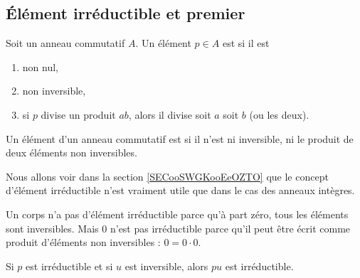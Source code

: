 \subsection{Élément irréductible et premier}

\begin{definition}       \label{DEFooZCRQooWXRalw}
	Soit un anneau commutatif \( A\). Un élément \( p\in A\) est  si il est
	\begin{enumerate}
		\item
		      non nul,
		\item
		      non inversible,
		\item       \label{ITEMooPMTTooCVHPIm}
		      si \( p\) divise un produit \( ab\), alors il divise soit \( a\) soit \( b\) (ou les deux).
	\end{enumerate}
\end{definition}

\begin{definition}  \label{DeirredBDhQfA}
	Un élément d'un anneau commutatif est  si il n'est ni inversible, ni le produit de deux éléments non inversibles. 
\end{definition}

\begin{normaltext}
	Nous allons voir dans la section \ref{SECooSWGKooEeOZTO} que le concept d'élément irréductible n'est vraiment utile que dans le cas des anneaux intègres.
\end{normaltext}

\begin{example}
	Un corps n'a pas d'élément irréductible parce qu'à part zéro, tous les éléments sont inversibles. Mais \( 0\) n'est pas irréductible parce qu'il peut être écrit comme produit d'éléments non inversibles : \( 0=0\cdot 0\).
\end{example}

\begin{lemma}		\label{LEMooJBUJooScsiGc}
	Si \( p\) est irréductible et si \( u\) est inversible, alors \( pu\) est irréductible.
\end{lemma}


